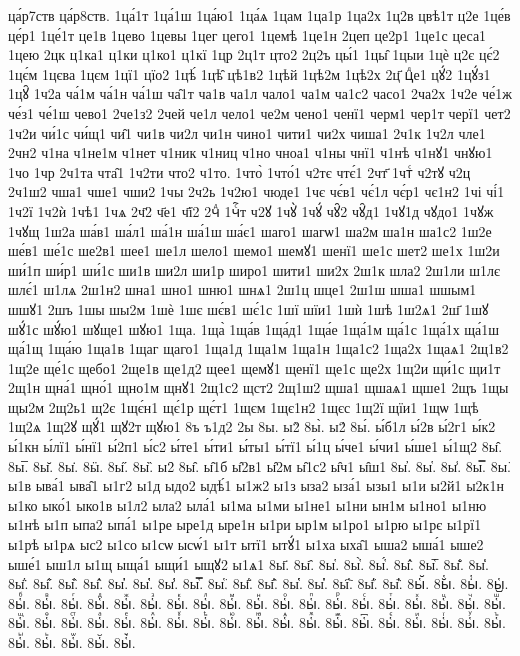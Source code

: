 {ца́р7ств
ца́р8ств.
1ца́1т
1ца́1ш
1ца́ю1
1ца́ѧ
1цам
1ца1р
1ца2х
1ц2в
цвѣ1т
ц2е
1це́в
це́р1
1це́1т
це1в
1цево
1цевы
1цег
цего1
1цемѣ
1це1н
2цеп
це2р1
1це1с
цеса1
1цею
2цк
ц1ка1
ц1ки
ц1ко1
ц1кї
1цр
2ц1т
цто2
2ц2ъ
цы́1
1цы̑
1цыи
1цѐ
ц2є
цє́2
1цє́м
1цєва
1цєм
1цї1
цїо2
1цѣ́
1цѣ̑
цѣ1в2
1цѣй
1цѣ2м
1цѣ2х
2ц҃
цⷣе1
цꙋ́2
1цꙋ́з1
1цꙋ̑
1ч2а
ча́1м
ча́1н
ча́1ш
ча̑1т
ча1в
ча1л
чало1
ча1м
ча1с2
часо1
2ча2х
1ч2е
че́1ж
че́з1
че́1ш
чево1
2че1з2
2чей
че1л
чело1
че2м
чено1
ченї1
черм1
чер1т
черї1
чет2
1ч2и
чи́1с
чи́щ1
чи̑1
чи1в
чи2л
чи1н
чино1
чити1
чи2х
чиша1
2ч1к
1ч2л
чле1
2чн2
ч1на
ч1не1м
ч1нет
ч1ник
ч1ниц
ч1но
чноа1
ч1ны
чнї1
ч1нѣ
ч1нꙋ1
чнꙋю1
1чо
1чр
2ч1та
чта̑1
1ч2ти
что2
ч1то.
1что̀
1что́1
ч2тє
чтє́1
2чт҃
1чтⷭ
ч2тꙋ
ч2ц
2ч1ш2
чша1
чше1
чши2
1чы
2ч2ь
1ч2ю1
чюде1
1чє
чє́в1
чє́1л
чє́р1
чє1н2
1чі
чі́1
1ч2ї
1ч2ѝ
1чѣ1
1чѧ
2ч҃2
ч҃е1
ч҃ї2
2чⷣ
1чⷭ҇т
ч2ꙋ
1чꙋ̀
1чꙋ́
чꙋ̑2
чꙋ̑д1
1чꙋ1д
чꙋдо1
1чꙋж
1чꙋщ
1ш2а
ша́в1
ша́л1
ша́1н
ша́1ш
ша́є1
шаго1
шагѡ1
ша2м
ша1н
ша1с2
1ш2е
ше́в1
ше́1с
ше2в1
шее1
ше1л
шело1
шемо1
шемꙋ1
шенї1
ше1с
шет2
ше1х
1ш2и
ши́1п
ши́р1
ши́1с
ши1в
ши2л
ши1р
широ1
шити1
ши2х
2ш1к
шла2
2ш1ли
ш1лє
шлє́1
ш1лѧ
2ш1н2
шна1
шно1
шню1
шнѧ1
2ш1ц
шце1
2ш1ш
шша1
шшым1
шшꙋ1
2шъ
1шы
шы2м
1шѐ
1шє
шє́в1
шє́1с
1шї
шїи1
1шѝ
1шѣ
1ш2ѧ1
2ш҃
1шꙋ
шꙋ́1с
шꙋ́ю1
шꙋще1
шꙋю1
1ща.
1ща̀
1ща́в
1ща́д1
1ща́е
1ща́1м
ща́1с
1ща́1х
ща́1ш
ща́1щ
1ща́ю
1ща1в
1щаг
щаго1
1ща1д
1ща1м
1ща1н
1ща1с2
1ща2х
1щаѧ1
2щ1в2
1щ2е
ще́1с
щебо1
2ще1в
ще1д2
щее1
щемꙋ1
щенї1
ще1с
ще2х
1щ2и
щи́1с
щи1т
2щ1н
щна́1
щно́1
щно1м
щнꙋ1
2щ1с2
щст2
2щ1ш2
щша1
щшаѧ1
щше1
2щъ
1щы
щы2м
2щ2ь1
щ2є
1щє́н1
щє́1р
щє́т1
1щєм
1щє1н2
1щєс
1щ2ї
щїи1
1щѡ
1щѣ
1щ2ѧ
1щ2ꙋ
щꙋ́1
щꙋ2т
щꙋю1
8ъ
ъ1д2
2ы
8ы.
ы2̀
8ы̀.
ы2́
8ы́.
ы́б1л
ы́2в
ы́2г1
ы́к2
ы́1кн
ы́лї1
ы́нї1
ы́2п1
ы́с2
ы́те1
ы́ти1
ы́ты1
ы́тї1
ы́1ц
ы́че1
ы́чи1
ы́ше1
ы́1щ2
8ы̂.
8ы̅.
8ы̆.
8ы̇.
8ӹ.
8ы̋.
8ы̏.
ы2̑
8ы̑.
ы̑1б
ы̑2в1
ы̑2м
ы̑1с2
ы̑ч1
ы̑ш1
8ы̓.
8ы̔.
8ы̾.
8ы̿.
8ы͘.
ы1в
ыва́1
ыва̑1
ы1г2
ы1д
ыдо2
ыдѣ́1
ы1ж2
ы1з
ыза2
ыза́1
ызы1
ы1и
ы2й1
ы2к1н
ы1ко
ыко́1
ыко1в
ы1л2
ыла2
ыла́1
ы1ма
ы1ми
ы1не1
ы1ни
ын1м
ы1но1
ы1ню
ы1нѣ
ы1п
ыпа2
ыпа́1
ы1ре
ыре1д
ыре1н
ы1ри
ыр1м
ы1ро1
ы1рю
ы1рє
ы1рї1
ы1рѣ
ы1рѧ
ыс2
ы1со
ы1сѡ
ысѡ́1
ы1т
ытї1
ытꙋ́1
ы1ха
ыха̑1
ыша2
ыша́1
ыше2
ыше́1
ыш1л
ы1щ
ыща́1
ыщи́1
ыщꙋ2
ы1ѧ1
8ы҃.
8ы҄.
8ы҅.
8ы҅̀.
8ы҅́.
8ы҅̂.
8ы҅̅.
8ы҅̆.
8ы҅̇.
8ы҅̈.
8ы҅̋.
8ы҅̏.
8ы҅̑.
8ы҅̓.
8ы҅̔.
8ы҅̾.
8ы҅̿.
8ы҅͘.
8ы҅҃.
8ы҅҄.
8ы҅҅.
8ы҅҆.
8ы҅҇.
8ы҅᷀.
8ы҅᷁.
8ы҅᷶.
8ы᷷҅.
8ы᷸҅.
8ы᷹҅.
8ы҅ⷠ.
8ы҅ⷡ.
8ы҅ⷢ.
8ы҅ⷣ.
8ы҅ⷤ.
8ы҅ⷥ.
8ы҅ⷦ.
8ы҅ⷧ.
8ы҅ⷨ.
8ы҅ⷩ.
8ы҅ⷪ.
8ы҅ⷫ.
8ы҅ⷬ.
8ы҅ⷭ.
8ы҅ⷮ.
8ы҅ⷯ.
8ы҅ⷰ.
8ы҅ⷱ.
8ы҅ⷲ.
8ы҅ⷳ.
8ы҅ⷴ.
8ы҅ⷵ.
8ы҅ⷶ.
8ы҅ⷷ.
8ы҅ⷸ.
8ы҅ⷹ.
8ы҅ⷺ.
8ы҅ⷻ.
8ы҅ⷼ.
8ы҅ⷽ.
8ы҅ⷾ.
8ы҅ⷿ.
8ы҅꙯.
8ы҅ꙴ.
8ы҅ꙵ.
8ы҅ꙶ.
8ы҅ꙷ.
8ы҅ꙸ.
8ы҅ꙹ.
8ы҅ꙺ.
8ы҅ꙻ.
8ы҅꙼.
8ы҅꙽.
}
